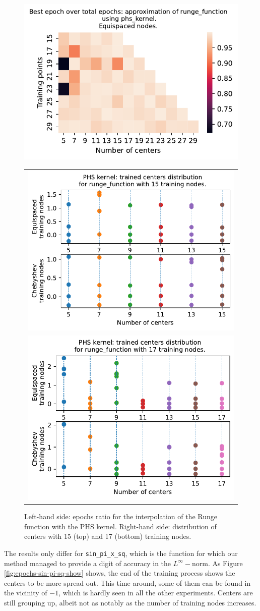 \documentclass[12pt]{report} %
\begin{document}
\begin{figure}[ht]
  \centering
  \includegraphics[width=.49\textwidth, align=c]{imagenes/experiments/1d/variational_epochs/runge_function-Kphs_kernel-Equi-epochs.pdf}
  \begin{tabular}{l}
    \includegraphics[width=.45\textwidth, trim={0 4.47cm 0 0}, clip=true]{imagenes/experiments/1d/phs_nodes_asymptotic/runge_function_TR15.pdf} \\
    \includegraphics[width=.45\textwidth, trim={0 4.47cm 0 0}, clip=true]{imagenes/experiments/1d/phs_nodes_asymptotic/runge_function_TR17.pdf}
  \end{tabular}

  \caption{Left-hand side: epochs ratio for the interpolation of the Runge function with the PHS kernel. Right-hand side: distribution of centers with 15 (top) and 17 (bottom) training nodes.}
  \label{fig:epochs-runge-phs-show}
\end{figure}

The results only differ for \texttt{sin\_pi\_x\_sq}, which is the function for which our method managed to provide a digit of accuracy in the $L^\infty-$norm. As Figure \ref{fig:epochs-sin-pi-sq-show} shows, the end of the training process shows the centers to be more spread out. This time around, some of them can be found in the vicinity of $-1$, which is hardly seen in all the other experiments. Centers are still grouping up, albeit not as notably as the number of training nodes increases.
\end{document}
